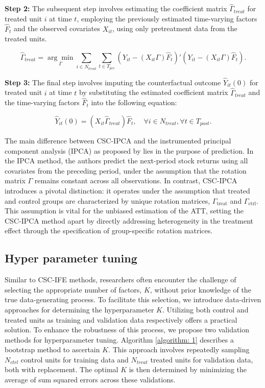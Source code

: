 \documentclass[12pt]{article}
\begin{document}
\textbf{Step 2:} The subsequent step involves estimating the coefficient matrix $\hat{\Gamma}_{treat}$ for treated unit $i$ at time $t$, employing the previously estimated time-varying factors $\hat{F}_t$ and the observed covariates $X_{it}$, using only pretreatment data from the treated units.

\begin{equation}
\hat{\Gamma}_{treat} = \underset{\Gamma}{\arg\min} \sum_{i \in N_{treat}} \sum_{t \in T_{pre}} \left( Y_{it} - (X_{it} \Gamma) \hat{F}_{t} \right)' \left( Y_{it} - (X_{it} \Gamma) \hat{F}_{t} \right).
\tag{4}
\end{equation}

\textbf{Step 3:} The final step involves imputing the counterfactual outcome $\hat{Y}_{it}(0)$ for treated unit $i$ at time $t$ by substituting the estimated coefficient matrix $\hat{\Gamma}_{treat}$ and the time-varying factors $\hat{F}_t$ into the following equation:

\begin{equation}
\hat{Y}_{it}(0) = (X_{it} \hat{\Gamma}_{treat}) \hat{F}_{t}, \quad \forall i \in N_{treat}, \forall t \in T_{post}.
\tag{5}
\end{equation}

The main difference between CSC-IPCA and the instrumented principal component analysis (IPCA) as proposed by \cite{kelly2020instrumented} lies in the purpose of prediction. In the IPCA method, the authors predict the next-period stock returns using all covariates from the preceding period, under the assumption that the rotation matrix $\Gamma$ remains constant across all observations. In contrast, CSC-IPCA introduces a pivotal distinction: it operates under the assumption that treated and control groups are characterized by unique rotation matrices, $\Gamma_{\text{treat}}$ and $\Gamma_{\text{ctrl}}$. This assumption is vital for the unbiased estimation of the ATT, setting the CSC-IPCA method apart by directly addressing heterogeneity in the treatment effect through the specification of group-specific rotation matrices.

\subsection{Hyper parameter tuning}
Similar to CSC-IFE methods, researchers often encounter the challenge of selecting the appropriate number of factors, $K$, without prior knowledge of the true data-generating process. To facilitate this selection, we introduce data-driven approaches for determining the hyperparameter $K$. Utilizing both control and treated units as training and validation data respectively offers a practical solution. To enhance the robustness of this process, we propose two validation methods for hyperparameter tuning. Algorithm \ref{algorithm: 1} describes a bootstrap method to ascertain $K$. This approach involves repeatedly sampling $N_{ctrl}$ control units for training data and $N_{treat}$ treated units for validation data, both with replacement. The optimal $K$ is then determined by minimizing the average of sum squared errors across these validations.
\end{document}
